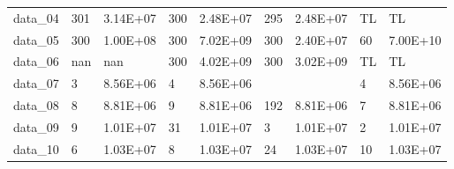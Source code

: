 \begin{table}[!h]
\begin{tabular}{lllllllll}
data\_04 & 301                                      & 3.14E+07                                     & 300                                       & 2.48E+07                                      & 295                                       & 2.48E+07                                     & TL                                        & TL                                           \\
data\_05 & 300                                      & 1.00E+08                                     & 300                                       & 7.02E+09                                      & 300                                       & 2.40E+07                                     & 60                                        & 7.00E+10                                     \\
data\_06 & nan                                      & nan                                          & 300                                       & 4.02E+09                                      & 300                                       & 3.02E+09                                     & TL                                        & TL                                           \\
data\_07 & 3                                        & 8.56E+06                                     & 4                                         & 8.56E+06                                      &                                           &                                              & 4                                         & 8.56E+06                                     \\
data\_08 & 8                                        & 8.81E+06                                     & 9                                         & 8.81E+06                                      & 192                                       & 8.81E+06                                     & 7                                         & 8.81E+06                                     \\
data\_09 & 9                                        & 1.01E+07                                     & 31                                        & 1.01E+07                                      & 3                                         & 1.01E+07                                     & 2                                         & 1.01E+07                                     \\
data\_10 & 6                                        & 1.03E+07                                     & 8                                         & 1.03E+07                                      & 24                                        & 1.03E+07                                     & 10                                        & 1.03E+07                                     \\

\end{tabular}
\end{table}
